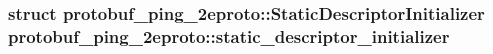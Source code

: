 \subsubsection[{\texorpdfstring{static\+\_\+descriptor\+\_\+initializer}{static_descriptor_initializer}}]{\setlength{\rightskip}{0pt plus 5cm}struct {\bf protobuf\+\_\+ping\+\_\+2eproto\+::\+Static\+Descriptor\+Initializer}  protobuf\+\_\+ping\+\_\+2eproto\+::static\+\_\+descriptor\+\_\+initializer}\hypertarget{namespaceprotobuf__ping__2eproto_a117cab3e5661b7c6b74347dae80dd6ea}{}\label{namespaceprotobuf__ping__2eproto_a117cab3e5661b7c6b74347dae80dd6ea}
